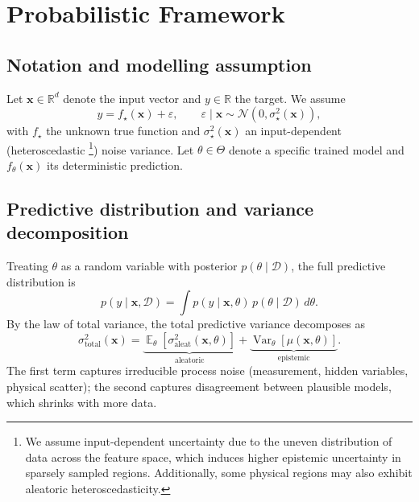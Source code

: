 \documentclass[conference]{IEEEtran}
\DeclareMathOperator{\Var}{Var}
\DeclareMathOperator{\E}{\mathbb{E}}
\begin{document}
\section{Probabilistic Framework}
\label{sec:framework}

\subsection{Notation and modelling assumption}

Let $\bm x \in \mathbb{R}^d$ denote the input vector and $y \in \mathbb{R}$ the target. We assume
\begin{equation}
y = f_\star(\bm x) + \varepsilon, \qquad \varepsilon \mid \bm x \sim \mathcal{N}(0, \sigma_\star^2(\bm x)),
\label{eq:data-model}
\end{equation}
with $f_\star$ the unknown true function and $\sigma_\star^2(\bm x)$ an input-dependent (heteroscedastic \footnote{We assume input-dependent uncertainty due to the uneven distribution of data across the feature space, which induces higher epistemic uncertainty in sparsely sampled regions. Additionally, some physical regions may also exhibit aleatoric heteroscedasticity.}) noise variance. Let $\theta \in \Theta$ denote a specific trained model and $f_\theta(\bm x)$ its deterministic prediction.

\subsection{Predictive distribution and variance decomposition}

Treating $\theta$ as a random variable with posterior $p(\theta \mid \mathcal{D})$, the full predictive distribution is
\begin{equation}
p(y \mid \bm x, \mathcal{D}) = \int p(y \mid \bm x, \theta) \, p(\theta \mid \mathcal{D}) \, d\theta.
\label{eq:posterior-predictive}
\end{equation}
By the law of total variance, the total predictive variance decomposes as
\begin{equation}
\sigma_{\text{total}}^2(\bm x) =
\underbrace{\E_\theta\!\left[\sigma^2_{\text{aleat}}(\bm x, \theta)\right]}_{\text{aleatoric}}
+ \underbrace{\Var_\theta\!\left[\mu(\bm x, \theta)\right]}_{\text{epistemic}}.
\label{eq:total-variance-decomp}
\end{equation}
The first term captures irreducible process noise (measurement, hidden variables, physical scatter); the second captures disagreement between plausible models, which shrinks with more data.
\end{document}
